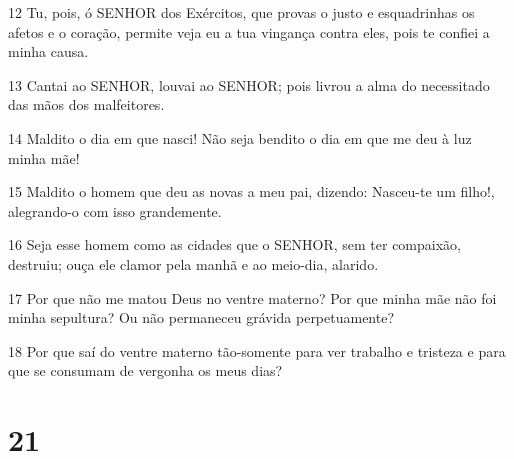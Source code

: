 \par 12 Tu, pois, ó SENHOR dos Exércitos, que provas o justo e esquadrinhas os afetos e o coração, permite veja eu a tua vingança contra eles, pois te confiei a minha causa.
\par 13 Cantai ao SENHOR, louvai ao SENHOR; pois livrou a alma do necessitado das mãos dos malfeitores.
\par 14 Maldito o dia em que nasci! Não seja bendito o dia em que me deu à luz minha mãe!
\par 15 Maldito o homem que deu as novas a meu pai, dizendo: Nasceu-te um filho!, alegrando-o com isso grandemente.
\par 16 Seja esse homem como as cidades que o SENHOR, sem ter compaixão, destruiu; ouça ele clamor pela manhã e ao meio-dia, alarido.
\par 17 Por que não me matou Deus no ventre materno? Por que minha mãe não foi minha sepultura? Ou não permaneceu grávida perpetuamente?
\par 18 Por que saí do ventre materno tão-somente para ver trabalho e tristeza e para que se consumam de vergonha os meus dias?

\chapter{21}

